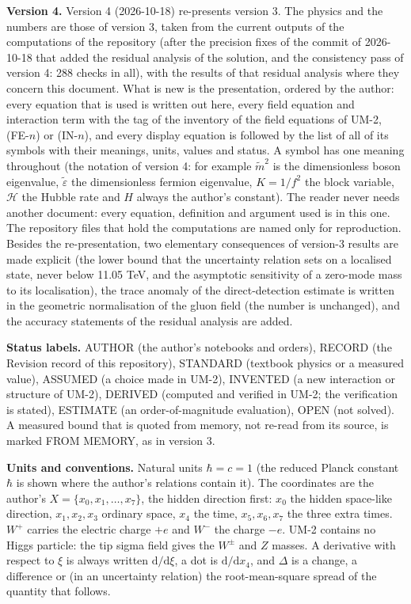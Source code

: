 \documentclass[
  10pt,
]{article}
\begin{document}
\textbf{Version 4.} Version 4 (2026-10-18) re-presents version 3. The
physics and the numbers are those of version 3, taken from the current
outputs of the computations of the repository (after the precision fixes
of the commit of 2026-10-18 that added the residual analysis of the
solution, and the consistency pass of version 4: 288 checks in all),
with the results of that residual analysis where they concern this
document. What is new is the presentation, ordered by the author: every
equation that is used is written out here, every field equation and
interaction term with the tag of the inventory of the field equations of
UM-2, (FE-\(n\)) or (IN-\(n\)), and every display equation is followed
by the list of all of its symbols with their meanings, units, values and
status. A symbol has one meaning throughout (the notation of version 4:
for example \(\tilde m^2\) is the dimensionless boson eigenvalue,
\(\tilde\varepsilon\) the dimensionless fermion eigenvalue,
\(K = 1/f^2\) the block variable, \(\mathcal{H}\) the Hubble rate and
\(H\) always the author's constant). The reader never needs another
document: every equation, definition and argument used is in this one.
The repository files that hold the computations are named only for
reproduction. Besides the re-presentation, two elementary consequences
of version-3 results are made explicit (the lower bound that the
uncertainty relation sets on a localised state, never below 11.05 TeV,
and the asymptotic sensitivity of a zero-mode mass to its localisation),
the trace anomaly of the direct-detection estimate is written in the
geometric normalisation of the gluon field (the number is unchanged),
and the accuracy statements of the residual analysis are added.

\textbf{Status labels.} AUTHOR (the author's notebooks and orders),
RECORD (the Revision record of this repository), STANDARD (textbook
physics or a measured value), ASSUMED (a choice made in UM-2), INVENTED
(a new interaction or structure of UM-2), DERIVED (computed and verified
in UM-2; the verification is stated), ESTIMATE (an order-of-magnitude
evaluation), OPEN (not solved). A measured bound that is quoted from
memory, not re-read from its source, is marked FROM MEMORY, as in
version 3.

\textbf{Units and conventions.} Natural units \(\hbar = c = 1\) (the
reduced Planck constant \(\hbar\) is shown where the author's relations
contain it). The coordinates are the author's
\(X = \{x_0, x_1, \dots, x_7\}\), the hidden direction first: \(x_0\)
the hidden space-like direction, \(x_1, x_2, x_3\) ordinary space,
\(x_4\) the time, \(x_5, x_6, x_7\) the three extra times. \(W^+\)
carries the electric charge \(+e\) and \(W^-\) the charge \(-e\). UM-2
contains no Higgs particle: the tip sigma field gives the \(W^\pm\) and
\(Z\) masses. A derivative with respect to \(\xi\) is always written
\(\mathrm{d}/\mathrm{d}\xi\), a dot is \(\mathrm{d}/\mathrm{d}x_4\), and
\(\Delta\) is a change, a difference or (in an uncertainty relation) the
root-mean-square spread of the quantity that follows.
\end{document}
